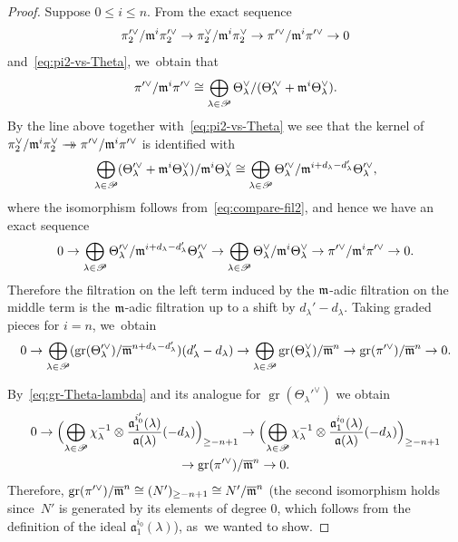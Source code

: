 \documentclass[JEP,XML,SOM,Unicode,NoFloatCountersInSection, NoEqCountersInSection,published]{cedram}
\newcommand{\onto}{\mathchoice{\to\hspace*{-5mm}\to}{\mathrel{\hbox{$\to\hspace*{-2.85mm}\to$}}}{\to\hspace*{-3mm}\to}{\to\hspace*{-3mm}\to}}
\let\ovl\overline
\newcommand{\fa}{\mathfrak{a}}
\DeclareMathOperator{\gr}{gr}
\theoremstyle{plain}
\theoremstyle{definition}
\begin{document}
\begin{proof}
Suppose $0 \le i \le n$.
From the exact sequence
\[
\pi_2'^\vee/\mathfrak{m}^i\pi_2'^\vee \to \pi_2^\vee/\mathfrak{m}^i\pi_2^\vee \to \pi'^\vee/\mathfrak{m}^i\pi'^\vee \to 0
\]
and~\eqref{eq:pi2-vs-Theta}, we~obtain that
\begin{equation*}
\pi'^\vee/\mathfrak{m}^i\pi'^\vee \cong \bigoplus_{\lambda\in\mathscr{P}} \Theta^\vee_\lambda/(\Theta'^\vee_\lambda + \mathfrak{m}^i\Theta^\vee_\lambda).
\end{equation*}
By the line above together with~\eqref{eq:pi2-vs-Theta} we see that the kernel of $\pi_2^\vee/\m^i\pi_2^\vee \onto \pi'^\vee/\m^i\pi'^\vee$ is identified with
\begin{equation*}
\bigoplus_{\lambda\in\mathscr{P}} (\Theta'^\vee_\lambda + \mathfrak{m}^i\Theta^\vee_\lambda)/\mathfrak{m}^i \Theta_\lambda^\vee \cong \bigoplus_{\lambda\in\mathscr{P}}\Theta'^\vee_\lambda/\mathfrak{m}^{i+d_\lambda-d_\lambda'} \Theta'^\vee_\lambda,
\end{equation*}
where the isomorphism follows from~\eqref{eq:compare-fil2},
and hence we have an exact sequence
\begin{equation*}
0 \to \bigoplus_{\lambda\in\mathscr{P}} \Theta'^\vee_\lambda/\mathfrak{m}^{i+d_\lambda-d_\lambda'} \Theta'^\vee_\lambda \to \bigoplus_{\lambda\in\mathscr{P}} \Theta^\vee_\lambda/\mathfrak{m}^i \Theta^\vee_\lambda \to \pi'^\vee/\mathfrak{m}^i\pi'^\vee \to 0.
\end{equation*}
Therefore the filtration on the left term induced by the $\mathfrak{m}$-adic filtration on the middle term is the $\mathfrak{m}$-adic filtration up to a shift by $d_\lambda'-d_\lambda$.
Taking graded pieces for $i = n$, we~obtain
\begin{equation*}
0 \to \bigoplus_{\lambda\in\mathscr{P}} (\gr(\Theta_\lambda'^\vee)/\ovl\m^{n+d_\lambda-d_\lambda'})(d_\lambda'-d_\lambda) \to \bigoplus_{\lambda\in\mathscr{P}} \gr(\Theta_\lambda^\vee)/\ovl\m^n \to \gr(\pi'^\vee)/\ovl\m^n \to 0.
\end{equation*}
\par\noindent
By~\eqref{eq:gr-Theta-lambda} and its analogue for $\gr(\Theta_\lambda'^\vee)$ we obtain\vspace*{-5pt}
\begin{multline*}
0 \to \Bigl(\bigoplus_{\lambda\in\mathscr{P}}\chi_{\lambda}^{-1}\otimes \frac{\fa_1^{i'_0}(\lambda)}{\fa(\lambda)}(-d_\lambda)\Bigr)_{\ge -n+1} \to \Bigl(\bigoplus_{\lambda\in\mathscr{P}}\chi_{\lambda}^{-1}\otimes \frac{\fa_1^{i_0}(\lambda)}{\fa(\lambda)}(-d_\lambda)\Bigr)_{\ge -n+1}\\
\to \gr(\pi'^\vee)/\ovl\m^n \to 0.
\end{multline*}
Therefore, $\gr(\pi'^\vee)/\ovl\m^n \cong (N')_{\ge -n+1} \cong N'/\ovl\m^n$ (the second isomorphism holds since~$N'$ is generated by its elements of degree 0, which follows from the definition of the ideal $\fa_1^{i_0}(\lambda)$), as~we wanted to show.


\end{proof}
\end{document}
